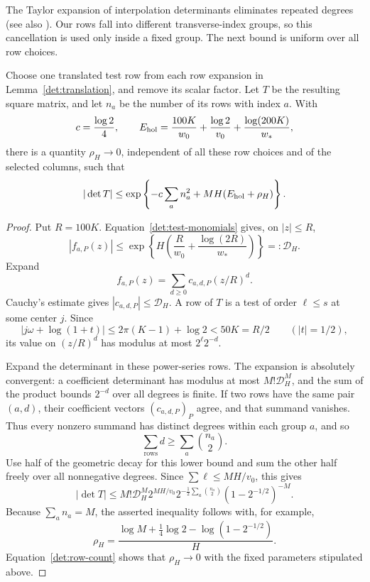 The Taylor expansion of interpolation determinants eliminates repeated
degrees \cite[Theorem~1]{laurent2000} (see also \cite[Chapter~9]{waldschmidt2000}). Our rows fall into different
transverse-index groups, so this cancellation is used only inside a
fixed group. The next bound is uniform over all row choices.

\begin{lemma}\label{det:collision}
Choose one translated test row from each row expansion in
Lemma~\ref{det:translation}, and remove its scalar factor.  Let $T$ be
the resulting square matrix, and let $n_a$ be the number of its rows
with index $a$.  With
\begin{equation}
 c=\frac{\log2}{4},\qquad
 E_{\rm hol}=\frac{100K}{w_0}+\frac{\log2}{v_0}
             +\frac{\log(200K)}{w_*},
 \label{det:hol-error}
\end{equation}
there is a quantity $\rho_H\to0$, independent of all these row
choices and of the selected columns, such that
\begin{equation}
 |\det T|
 \le\exp\left\{-c\sum_a n_a^2+MH(E_{\rm hol}+\rho_H)\right\}.
 \label{det:collision-bound}
\end{equation}
\end{lemma}

\begin{proof}
Put $R=100K$.  Equation~\eqref{det:test-monomials} gives, on $|z|\le R$,
\[
 |f_{a,P}(z)|\le
 \exp\left\{H\left(\frac R{w_0}
                      +\frac{\log(2R)}{w_*}\right)\right\}
 =:\mathcal D_H.
\]
Expand
\[
 f_{a,P}(z)=\sum_{d\ge0}c_{a,d,P}(z/R)^d.
\]
Cauchy's estimate gives $|c_{a,d,P}|\le\mathcal D_H$.  A row of $T$ is
a test of order $\ell\le s$ at some center $j$.  Since
\[
 |j\omega+\log(1+t)|
 \le2\pi(K-1)+\log2<50K=R/2
 \qquad(|t|=1/2),
\]
its value on $(z/R)^d$ has modulus at most $2^\ell2^{-d}$.

Expand the determinant in these power-series rows.  The expansion is
absolutely convergent: a coefficient determinant has modulus at most
$M!\mathcal D_H^M$, and the sum of the product bounds $2^{-d}$ over
all degrees is finite.  If two rows have the same pair $(a,d)$, their
coefficient vectors $(c_{a,d,P})_P$ agree, and that summand vanishes.
Thus every nonzero summand has distinct degrees within each group
$a$, and so
\[
 \sum_{\text{rows}}d\ge\sum_a\binom{n_a}{2}.
\]
Use half of the geometric decay for this lower bound and sum the
other half freely over all nonnegative degrees.  Since
$\sum\ell\le MH/v_0$, this gives
\[
 |\det T|
 \le M!\mathcal D_H^M2^{MH/v_0}
       2^{-\frac12\sum_a\binom{n_a}{2}}
       (1-2^{-1/2})^{-M}.
\]
Because $\sum_a n_a=M$, the asserted inequality follows with, for
example,
\[
 \rho_H=\frac{\log M+\frac14\log2
                    -\log(1-2^{-1/2})}{H}.
\]
Equation~\eqref{det:row-count} shows that $\rho_H\to0$ with the fixed
parameters stipulated above.
\end{proof}

